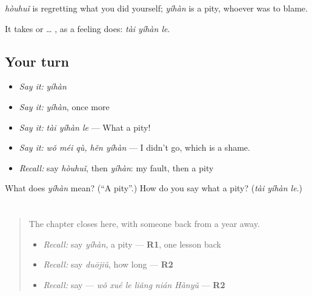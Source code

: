 \begin{grammarlens}[title={What you've built}]
\emph{hòuhuǐ} is regretting what you did yourself; \emph{yíhàn} is a pity, whoever was to blame.

It takes  or  … , as a feeling does: \emph{tài yíhàn le}.
\end{grammarlens}

\subsection*{Your turn}
\begin{itemize}
\raggedright
  \item \emph{Say it:} \emph{yíhàn}
  \item \emph{Say it:} \emph{yíhàn}, once more
  \item \emph{Say it:} \emph{tài yíhàn le} — What a pity!
  \item \emph{Say it:} \emph{wǒ méi qù, hěn yíhàn} — I didn't go, which is a shame.
  \item \emph{Recall:} say \emph{hòuhuǐ}, then \emph{yíhàn}: my fault, then a pity
\end{itemize}

\begin{tcolorbox}[breakable,colback=teal!4,colframe=teal!35!black,title={Before you move on}]
What does \emph{yíhàn} mean? (\textquotedblleft{}A pity\textquotedblright{}.) How do you say what a pity? (\emph{tài yíhàn le}.)
\end{tcolorbox}
\section[Practice]{}

\label{lesson:ZH-C286-practice}



\begin{quote}
The chapter closes here, with someone back from a year away.

\begin{itemize}
\raggedright
  \item \emph{Recall:} say \emph{yíhàn}, a pity — \textbf{R1}, one lesson back
  \item \emph{Recall:} say \emph{duōjiǔ}, how long — \textbf{R2}
  \item \emph{Recall:} say  — \emph{wǒ xué le liǎng nián Hànyǔ} — \textbf{R2}
\end{itemize}
\end{quote}

